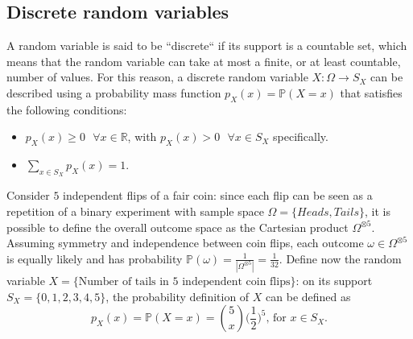 \documentclass{report}
\begin{document}
\subsection{Discrete random variables}
A random variable is said to be ``discrete`` if its support is a countable set, which means that the random variable can take at most a finite, or at least countable, number of values. \newline
For this reason, a discrete random variable $\displaystyle X: \Omega \to S_X$ can be described using a probability mass function $\displaystyle p_X(x) = \mathbb{P}(X = x)$ that satisfies the following conditions:
\begin{itemize}
    \item $\displaystyle p_X(x) \ge 0 \text{ } \forall x \in \mathbb{R}$, with $\displaystyle p_X(x) > 0 \text{ } \forall x \in S_X$ specifically.
    \item $\displaystyle \sum_{x \in S_X} p_X(x) = 1$.
\end{itemize}
\begin{examplebox}
    Consider $\displaystyle 5$ independent flips of a fair coin: since each flip can be seen as a repetition of a binary experiment with sample space $\displaystyle \Omega = \{Heads, Tails\}$, it is possible to define the overall outcome space as the Cartesian product $\displaystyle \Omega^{\otimes 5}$. \newline
    Assuming symmetry and independence between coin flips, each outcome $\displaystyle \omega \in \Omega^{\otimes 5}$ is equally likely and has probability $\displaystyle \mathbb{P}(\omega) = \frac{1}{|\Omega^{\otimes 5}|} = \frac{1}{32}$. \newline
    Define now the random variable $\displaystyle X = \{\text{Number of tails in $5$ independent coin flips}\}$: on its support $\displaystyle S_X = \{0, 1, 2, 3, 4, 5\}$, the probability definition of $\displaystyle X$ can be defined as
    \[p_X(x) = \mathbb{P}(X = x) = \binom{5}{x}\bigg(\frac{1}{2}\bigg)^5 \text{, for $x \in S_X$.}\]
\end{examplebox}
\end{document}

